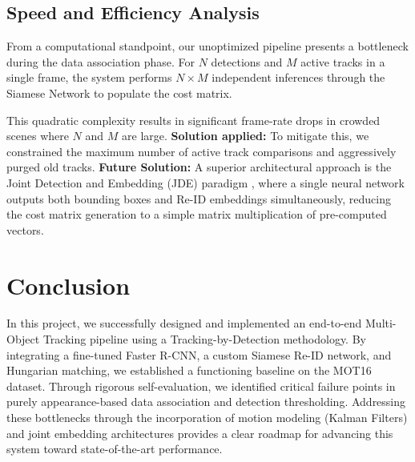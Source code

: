 \documentclass[11pt, letterpaper]{article}
\begin{document}
\subsection{Speed and Efficiency Analysis}
From a computational standpoint, our unoptimized pipeline presents a bottleneck during the data association phase. For $N$ detections and $M$ active tracks in a single frame, the system performs $N \times M$ independent inferences through the Siamese Network to populate the cost matrix. 

This quadratic complexity results in significant frame-rate drops in crowded scenes where $N$ and $M$ are large. 
\textbf{Solution applied:} To mitigate this, we constrained the maximum number of active track comparisons and aggressively purged old tracks. 
\textbf{Future Solution:} A superior architectural approach is the Joint Detection and Embedding (JDE) paradigm \cite{wang2020towards}, where a single neural network outputs both bounding boxes and Re-ID embeddings simultaneously, reducing the cost matrix generation to a simple matrix multiplication of pre-computed vectors.

\section{Conclusion}
In this project, we successfully designed and implemented an end-to-end Multi-Object Tracking pipeline using a Tracking-by-Detection methodology. By integrating a fine-tuned Faster R-CNN, a custom Siamese Re-ID network, and Hungarian matching, we established a functioning baseline on the MOT16 dataset. Through rigorous self-evaluation, we identified critical failure points in purely appearance-based data association and detection thresholding. Addressing these bottlenecks through the incorporation of motion modeling (Kalman Filters) and joint embedding architectures provides a clear roadmap for advancing this system toward state-of-the-art performance.
\end{document}
